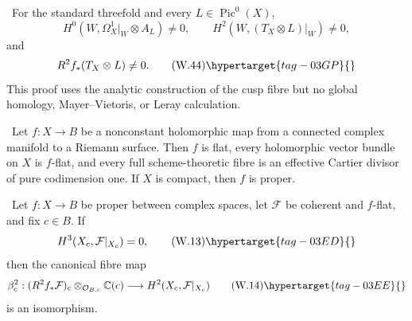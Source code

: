 
\begin{corollary}
\hypertarget{tag-03DS}{}\label{wbII:cor:candidate-pic0-route}


\ For the standard threefold and every
$L\in\operatorname{Pic}^0(X)$,
\[
 H^0(W,\Omega_X^1|_W\otimes A_L)\ne0,
 \qquad
 H^2(W,(T_X\otimes L)|_W)\ne0,
\]
and
\[
 R^2f_*(T_X\otimes L)\ne0.
\tag{W.44}\hypertarget{tag-03GP}{}\label{wbII:eq:W:5.17f}
\]
This proof uses the analytic construction of the cusp fibre but no global
homology, Mayer--Vietoris, or Leray calculation.
\end{corollary}

\begin{lemma}
\hypertarget{tag-03I8}{}\label{wbII:lem:curve-flatness}


\ Let $f:X\to B$ be a nonconstant holomorphic map from a connected
complex manifold to a Riemann surface.  Then $f$ is flat, every holomorphic
vector bundle on $X$ is $f$-flat, and every full scheme-theoretic fibre is an
effective Cartier divisor of pure codimension one.  If $X$ is compact, then
$f$ is proper.
\end{lemma}

\begin{proposition}
\hypertarget{tag-03II}{}\label{wbII:prop:analytic-base-change}


\ Let $f:X\to B$ be proper between complex spaces, let
$\mathcal F$ be coherent and $f$-flat, and fix $c\in B$.  If
\[
H^3(X_c,\mathcal F|_{X_c})=0,
\tag{W.13}\hypertarget{tag-03ED}{}\label{wbII:eq:W:5.16}
\]
then the canonical fibre map
\[
\beta_c^2:
(R^2f_*\mathcal F)_c\otimes_{\mathcal O_{B,c}}\mathbb C(c)
\longrightarrow H^2(X_c,\mathcal F|_{X_c})
\tag{W.14}\hypertarget{tag-03EE}{}\label{wbII:eq:W:5.17}
\]
is an isomorphism.
\end{proposition}

